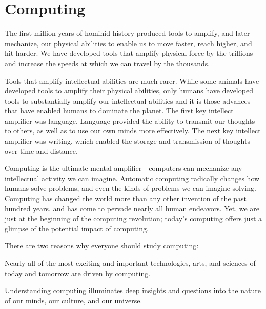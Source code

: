 \chapter{Computing}\label{ch:intro}
\slatexignorecurrentfile


\topics{}

The first million years of hominid history produced tools to amplify, and later mechanize, our physical abilities to enable us to move faster, reach higher, and hit harder.  We have developed tools that amplify physical force by the trillions and increase the speeds at which we can travel by the thousands.  

Tools that amplify intellectual abilities are much rarer.  While some animals have developed tools to amplify their physical abilities, only humans have developed tools to substantially amplify our intellectual abilities and it is those advances that have enabled humans to dominate the planet.  The first key intellect amplifier was language.  Language provided the ability to transmit our thoughts to others, as well as to use our own minds more effectively.  The next key intellect amplifier was writing, which enabled the storage and transmission of thoughts over time and distance.  %

Computing is the ultimate mental amplifier---computers can mechanize any intellectual activity we can imagine.  Automatic computing radically changes how humans solve problems, and even the kinds of problems we can imagine solving.  Computing has changed the world more than any other invention of the past hundred years, and has come to pervade nearly all human endeavors.  Yet, we are just at the beginning of the computing revolution; today's computing offers just a glimpse of the potential impact of computing.   

There are two reasons why everyone should study computing:
\begin{enumtight}
\item Nearly all of the most exciting and important technologies, arts, and sciences of today and tomorrow are driven by computing.
\item Understanding computing illuminates deep insights and questions into the nature of our minds, our culture, and our universe.
\end{enumtight}

